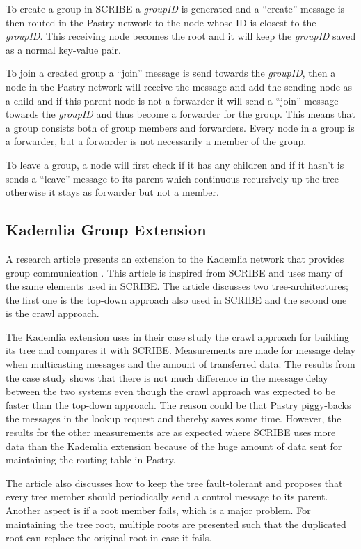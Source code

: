To create a group in SCRIBE a \emph{groupID} is generated and a ``create'' message is then routed in the Pastry network to the node whose ID is closest to the \emph{groupID}. This receiving node becomes the root and it will keep the \emph{groupID} saved as a normal key-value pair.

To join a created group a ``join'' message is send towards the \emph{groupID}, then a node in the Pastry network will receive the message and add the sending node as a child and if this parent node is not a forwarder it will send a ``join'' message towards the \emph{groupID} and thus become a forwarder for the group. This means that a group consists both of group members and forwarders. Every node in a group is a forwarder, but a forwarder is not necessarily a member of  the group. 

To leave a group, a node will first check if it has any children and if it hasn't is sends a ``leave'' message to its parent which continuous recursively up the tree otherwise it stays as forwarder but not a member.

 
\subsection{Kademlia Group Extension}
A research article presents an extension to the Kademlia network that provides group communication \cite{groKdml}. This article is inspired from SCRIBE and uses many of the same elements used in SCRIBE. The article discusses two tree-architectures; the first one is the top-down approach also used in SCRIBE and the second one is the crawl approach.

The Kademlia extension uses in their case study the crawl approach for building its tree and compares it with SCRIBE. Measurements are made for message delay when multicasting messages and the amount of transferred data. The results from the case study shows that there is not much difference in the message delay between the two systems even though the crawl approach was expected to be faster than the top-down approach. The reason could be that Pastry piggy-backs the messages in the lookup request and thereby saves some time. However, the results for the other measurements are as expected where SCRIBE uses more data than the Kademlia extension because of the huge amount of data sent for maintaining the routing table in Pastry.

The article also discusses how to keep the tree fault-tolerant and proposes that every tree member should periodically send a control message to its parent. Another aspect is if a root member fails, which is a major problem. For maintaining the tree root, multiple roots are presented such that the duplicated root can replace the original root in case it fails.


